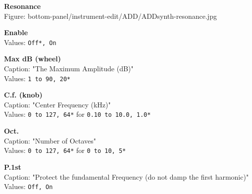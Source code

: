 \documentclass[
 11pt,
 twoside,
 a4paper,
 headinclude,
 footinclude,
 final                                 %
]{article}
\begin{document}
\begin{enumber}
\begin{enumber}
\begin{enumber}
         \item \textbf{Resonance} \\
            Figure: bottom-panel/instrument-edit/ADD/ADDsynth-resonance.jpg
            \begin{enumber}
               \item \textbf{Enable} \\
                  Values: \texttt{Off*, On}
               \item \textbf{Max dB (wheel)} \\
                  Caption: "The Maximum Amplitude (dB)" \\
                  Values: \texttt{1 to 90, 20*}
               \item \textbf{C.f. (knob)} \\
                  Caption: "Center Frequency (kHz)" \\
                  Values: \texttt{0 to 127, 64*} for \texttt{0.10 to 10.0, 1.0*}
               \item \textbf{Oct.} \\
                  Caption: "Number of Octaves" \\
                  Values: \texttt{0 to 127, 64*} for \texttt{0 to 10, 5*}
               \item \textbf{P.1st} \\
                  Caption: "Protect the fundamental Frequency (do not damp
                     the first harmonic)" \\
                  Values: \texttt{Off, On}



\end{enumber}
\end{enumber}
\end{enumber}
\end{enumber}
\end{document}
